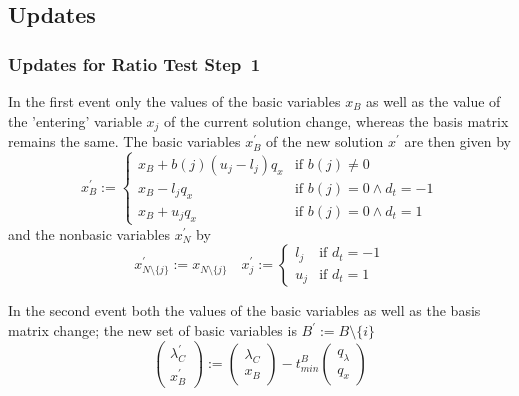 \documentclass[a4paper]{article}
\begin{document}
\subsection{Updates}

\subsubsection{Updates for Ratio Test Step~1}
In the first event only the values of the basic variables $x_{B}$ as well as 
the value of the 'entering' variable $x_{j}$ of the current solution change, whereas the basis matrix remains the same. The basic variables $x_{B}^{\prime}$ of the new solution $x^{\prime}$ are then given by
\begin{equation}
x_{B}^{\prime}:=
\left\{
\begin{array}{ll}
x_{B} + b(j)\left(u_{j}-l_{j}\right)q_{x}
&
\text{if $b(j) \neq 0$} \\
x_{B} - l_{j}q_{x}
&
\text{if $b(j)=0 \wedge d_{t}=-1$} \\
x_{B} + u_{j}q_{x}
&
\text{if $b(j)=0\wedge d_{t}=1$}
\end{array}
\right.
\end{equation}
and the nonbasic variables $x_{N}^{\prime}$ by
\begin{equation}
x_{N \setminus\{j\}}^{\prime}:=x_{N \setminus \{j\}}
\quad
x_{j}^{\prime}:=
\left\{
\begin{array}{ll}
l_{j} 
&
\text{if $d_{t}=-1$} \\
u_{j}
&
\text{if $d_{t}=1$} 
\end{array}
\right.
\end{equation}

In the second event both the values of the basic variables as well as the basis matrix change; the new set of basic variables is $B^{\prime}:=B \setminus \{i\}$
\begin{equation}
\left(
\begin{array}{c}
\lambda_{C}^{\prime} \\
\hline
x_{B}^{\prime}
\end{array}
\right)
:=
\left(
\begin{array}{c}
\lambda_{C} \\
\hline
x_{B}
\end{array}
\right)
-t_{min}^{B}
\left(
\begin{array}{c}
q_{\lambda} \\
\hline
q_{x}
\end{array}
\right)
\end{equation}
\end{document}
